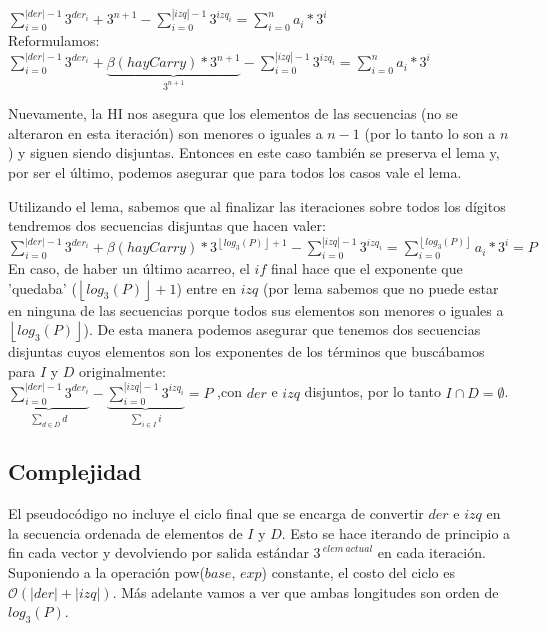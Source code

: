 \begin{itemize}
	$\sum_{i=0}^{|der|-1} 3^{der_i} + 3^{n+1} - \sum_{i=0}^{|izq|-1} 3^{izq_i} = \sum_{i=0}^{n} a_i*3^{i} $	\\

	Reformulamos: \\

	$\sum_{i=0}^{|der|-1} 3^{der_i} + \underbrace{\beta(hayCarry)*3^{n+1}}_\text{$3^{n+1}$} - \sum_{i=0}^{|izq|-1} 3^{izq_i} = \sum_{i=0}^{n} a_i*3^{i} $

	Nuevamente, la HI nos asegura que los elementos de las secuencias (no se alteraron en esta iteración) son menores o iguales a $n-1$ (por lo tanto lo son a $n$) y siguen siendo disjuntas. Entonces en este caso también se preserva el lema y, por ser el último, podemos asegurar que para todos los casos vale el lema. \QEDB
	\end{itemize}

	Utilizando el lema, sabemos que al finalizar las iteraciones sobre todos los dígitos tendremos dos secuencias disjuntas que hacen valer:
	\\

	$\sum_{i=0}^{|der|-1} 3^{der_i} + \beta(hayCarry)*3^{\left \lfloor{log_3(P)}\right \rfloor + 1} - \sum_{i=0}^{|izq|-1} 3^{izq_i} = \sum_{i=0}^{\left \lfloor{log_3(P)}\right \rfloor} a_i*3^{i} = P$
	\\

	En caso, de haber un último acarreo, el $if$ final hace que el exponente que 'quedaba' ($\left \lfloor{log_3(P)}\right \rfloor + 1$) entre en $izq$ (por lema sabemos que no puede estar en ninguna de las secuencias porque todos sus elementos son menores o iguales a $\left \lfloor{log_3(P)}\right \rfloor$). De esta manera podemos asegurar que tenemos dos secuencias disjuntas cuyos elementos son los exponentes de los términos que buscábamos para $I$ y $D$ originalmente:
	\\

	$\underbrace{\sum_{i=0}^{|der|-1} 3^{der_i}}_\text{$\sum_{d \in D} d$} - \underbrace{\sum_{i=0}^{|izq|-1} 3^{izq_i}}_\text{$\sum_{i \in I} i$} = P$
	,\quad con $der$ e $izq$ disjuntos, por lo tanto $I\cap D = \emptyset $.






\newpage
\subsection{Complejidad}
	El pseudocódigo no incluye el ciclo final que se encarga de convertir $der$ e $izq$ en la secuencia ordenada de elementos de $I$ y $D$. Esto se hace iterando de principio a fin cada vector y devolviendo por salida estándar $3^{\ elem \ actual}$ en cada iteración. Suponiendo a la operación pow($base$, $exp$) constante, el costo del ciclo es $\mathcal{O} (|der| + |izq|)$. Más adelante vamos a ver que ambas longitudes son orden de $log_3(P)$.

